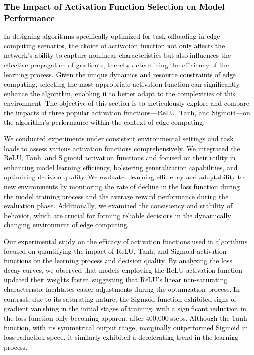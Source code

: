\documentclass[preprint,12pt]{elsarticle}
\begin{document}
\textcolor{black}{\subsubsection{The Impact of Activation Function Selection on Model Performance}}

\textcolor{black}{In designing algorithms specifically optimized for task offloading in edge computing scenarios, the choice of activation function not only affects the network's ability to capture nonlinear characteristics but also influences the effective propagation of gradients, thereby determining the efficiency of the learning process. Given the unique dynamics and resource constraints of edge computing, selecting the most appropriate activation function can significantly enhance the algorithm, enabling it to better adapt to the complexities of this environment. The objective of this section is to meticulously explore and compare the impacts of three popular activation functions—ReLU, Tanh, and Sigmoid—on the algorithm's performance within the context of edge computing.}

\textcolor{black}{We conducted experiments under consistent environmental settings and task loads to assess various activation functions comprehensively. We integrated the ReLU, Tanh, and Sigmoid activation functions and focused on their utility in enhancing model learning efficiency, bolstering generalization capabilities, and optimizing decision quality. We evaluated learning efficiency and adaptability to new environments by monitoring the rate of decline in the loss function during the model training process and the average reward performance during the evaluation phase. Additionally, we examined the consistency and stability of behavior, which are crucial for forming reliable decisions in the dynamically changing environment of edge computing.}

\textcolor{black}{Our experimental study on the efficacy of activation functions used in algorithms focused on quantifying the impact of ReLU, Tanh, and Sigmoid activation functions on the learning process and decision quality. By analyzing the loss decay curves, we observed that models employing the ReLU activation function updated their weights faster, suggesting that ReLU's linear non-saturating characteristic facilitates easier adjustments during the optimization process. In contrast, due to its saturating nature, the Sigmoid function exhibited signs of gradient vanishing in the initial stages of training, with a significant reduction in the loss function only becoming apparent after 400,000 steps. Although the Tanh function, with its symmetrical output range, marginally outperformed Sigmoid in loss reduction speed, it similarly exhibited a decelerating trend in the learning process.}
\end{document}
